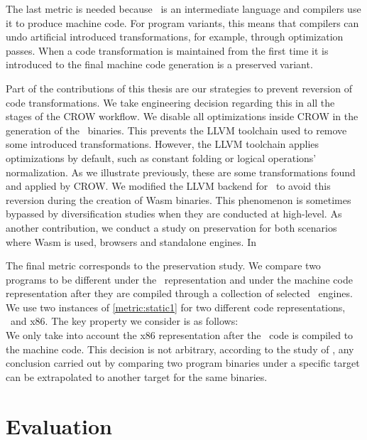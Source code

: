The last metric is needed because \wasm\ is an intermediate language and compilers use it to produce machine code. For program variants, this means that compilers can undo artificial introduced transformations, for example, through optimization passes. When a code transformation is maintained from the first time it is introduced to the final machine code generation is a preserved variant. 

Part of the contributions of this thesis are our strategies to prevent reversion of code transformations. We take engineering decision regarding this in all the stages of the CROW workflow. We disable all optimizations inside CROW in the generation of the \wasm\ binaries. This prevents the LLVM toolchain used to remove some introduced transformations. However, the LLVM toolchain applies optimizations by default, such as constant folding or logical operations' normalization. As we illustrate previously, these are some transformations found and applied by CROW. We modified the LLVM backend for \wasm\ to avoid this reversion during the creation of Wasm binaries.
This phenomenon is sometimes bypassed by diversification studies when they are conducted at high-level. As another contribution, we conduct a study on preservation for both scenarios where Wasm is used, browsers and standalone engines. In

The final metric corresponds to the preservation study. We compare two programs to be different under the \wasm\ representation and under the machine code representation after they are compiled through a collection of selected \wasm\ engines. We use two instances of \autoref{metric:static1} for two different code representations, \wasm\ and x86. The key property we consider is as follows: \\


We only take into account the x86 representation after the \wasm\ code is compiled to the machine code. 
This decision is not arbitrary, according to the study of , any conclusion carried out by comparing two program binaries under a specific target can be extrapolated to another target for the same binaries.


\section{Evaluation}

